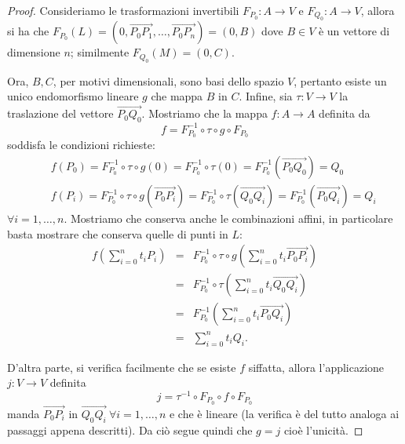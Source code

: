 \documentclass[a4paper,12pt]{article}
\newcommand{\Got}[1]{#1}
\newcommand{\got}[1]{{#1}}
\newcommand{\vet}[1]{\overrightarrow{#1}}
\begin{document}
 \begin{proof}
 \Got{Consideriamo le trasformazioni invertibili} $\got{F_{P_0}:A\rightarrow V}$ \Got{e} $\got{F_{Q_0}:A\rightarrow V}$,
 \Got{allora si ha che} $\got{F_{P_0}(L)=(0,\vet{P_0P_1},\dots,\vet{P_0P_n})=(0,B)}$ \Got{dove} $\got{B\in V}$ \Got{è un vettore}
 \Got{di dimensione} $\got{n}$; \Got{similmente} $\got{F_{Q_0}(M)=(0,C).}$
 
 \Got{Ora,} $\got{B,C}$, \Got{per motivi dimensionali, sono basi dello spazio} $\got{V}$, \Got{pertanto esiste un unico endomorfismo lineare}
 $\got{g}$ \Got{che mappa} $\got{B}$ \Got{in} $\got{C}$. \Got{Infine, sia} $\got{\tau:V\rightarrow V}$ \Got{la traslazione del vettore}
 $\got{\vet{P_0Q_0}}$. \Got{Mostriamo che la mappa} $\got{f:A\rightarrow A}$ \Got{definita da}
 \[
	\got{f = F_{P_0}^{-1} \circ \tau \circ g \circ F_{P_0}}
 \]
 \Got{soddisfa le condizioni richieste:}
 \begin{eqnarray*}
	&&\got{f(P_0)=F_{P_0}^{-1} \circ \tau \circ g (0) = F_{P_0}^{-1} \circ \tau (0) = F_{P_0}^{-1} (\vet{P_0Q_0}) = Q_0}\\
	&&\got{f(P_i)=F_{P_0}^{-1} \circ \tau \circ g (\vet{P_0P_i}) = F_{P_0}^{-1} \circ \tau (\vet{Q_0Q_i}) = F_{P_0}^{-1} (\vet{P_0Q_i}) = Q_i}
 \end{eqnarray*}
 $\got{\forall i=1,\dots,n}.$
 \Got{Mostriamo che conserva anche le combinazioni affini, in particolare basta mostrare che conserva quelle di punti in} $\got{L}$:
 \begin{eqnarray*}
	\got{f\left(\sum_{i=0}^{n}t_iP_i\right)}&=&\got{F_{P_0}^{-1} \circ \tau \circ g \left(\sum_{i=0}^{n}t_i\vet{P_0P_i}\right)}\\
	&=&\got{F_{P_0}^{-1} \circ \tau \left( \sum_{i=0}^{n}t_i\vet{Q_0Q_i}\right) }\\
	&=&\got{F_{P_0}^{-1} \left(\sum_{i=0}^{n}t_i\vet{P_0Q_i}\right)}\\
	&=&\got{\sum_{i=0}^{n}t_iQ_i}.
 \end{eqnarray*}
 
 \Got{D'altra parte, si verifica facilmente che se esiste} $\got{f}$ \Got{siffatta, allora l'applicazione} $\got{j:V\rightarrow V}$ 
 \Got{definita}
 \[
	\got{j = \tau^{-1} \circ F_{P_0} \circ f \circ F_{P_0}}
 \]
 \Got{manda } $\got{\vet{P_0P_i}}$ \Got{in} $\got{\vet{Q_0Q_i}\ \forall i=1,\dots,n}$
 \Got{e che è lineare (la verifica è del tutto analoga ai passaggi appena descritti). Da ciò segue quindi che } $\got{g=j}$ 
 \Got{cioè l'unicità.}
 \end{proof}
 
\end{document}
